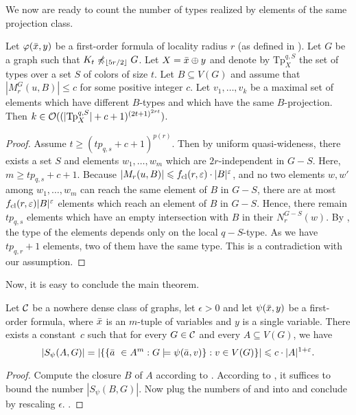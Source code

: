 We now are ready to count the number of types realized by elements
of the same projection class. 

\begin{lemma}\label{lem:num-types-same-class}
Let $\varphi(\bar{x},y)$ be a first-order formula of locality radius $r$ (as defined in ). 
Let $G$ be a graph such that $K_t\not\preccurlyeq_{\left\lfloor 5r/2\right\rfloor} G$. 
Let $X=\bar{x}\oplus y$ and denote by $\mathrm{Tp}^{q,S}_X$ the set of types over a 
set $S$ of colors of size $t$. Let 
$B\subseteq V(G)$ and assume that 
$|M_r^G(u,B)|\leq c$ for some positive integer
$c$. Let $v_1,\ldots, v_k$ be a maximal set
of elements which have different $B$-types and which
have the same $B$-projection. Then $k\in\mathcal{O}((|\mathrm{Tp}^{q,S}_X|+c+1)^{(2t+1)^{2rt}})$. 
\end{lemma}
\begin{proof}
Assume $t\geq (tp_{q,s}+c+1)^{p(r)}$. Then by uniform
quasi-wideness, there exists a set $S$ and elements 
$w_1,\ldots, w_m$ which are $2r$-independent in $G-S$. 
Here, $m\geq tp_{q,s}+c+1$. Because $|M_r(u,B)|\leqslant f_{\mathrm{cl}}(r,\varepsilon)\cdot |B|^{\varepsilon}$, and no two elements $w,w'$ among
$w_1,\ldots, w_m$ can reach the same element of $B$
in $G-S$, there are at most $f_{\mathrm{cl}}(r,\varepsilon)|B|^\varepsilon$
elements which reach an element of $B$ in $G-S$. 
Hence, there remain $tp_{q,s}$ elements which have
an empty intersection with $B$ in their $N_r^{G-S}(w)$. 
By , 
the type of the elements depends only on the local $q-S$-type. 
As we have $tp_{q,r}+1$ elements, two of them have the
same type. This is a contradiction with our assumption. 
\end{proof}

Now, it is easy to conclude the main theorem. 

\begin{theorem}
Let $\mathcal{C}$ be a nowhere dense class of graphs, 
let $\epsilon>0$ and let $\psi(\bar{x},y)$ be a first-order formula, where 
$\bar{x}$ is an $m$-tuple of variables and $y$ is a single variable. 
There exists a constant~$c$ such that for every $G\in \mathcal{C}$ 
and every
$A\subseteq V(G)$, we have 
\[|S_\psi(A,G)|=|\{\{\bar{a}\ \in A^m : G\models\psi(\bar{a},v)\} : v\in V(G)\}|\leqslant c\cdot |A|^{1+\varepsilon}.\]
\end{theorem}
\begin{proof}
Compute the closure $B$ of $A$ according to . 
According to , it suffices to bound the
number $|S_\psi(B,G)|$. Now plug the numbers of 
 and  
into  and conclude by rescaling $\epsilon$. . 
\end{proof}
